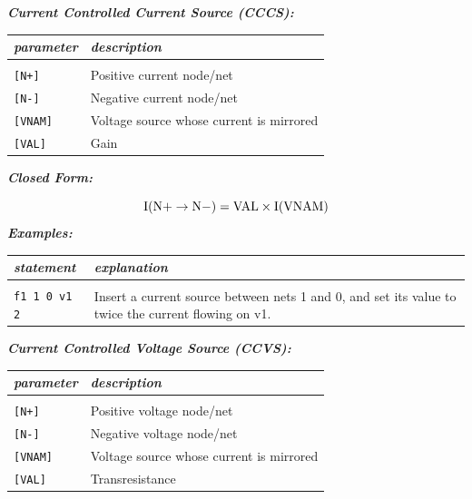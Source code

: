 \textbf{\textit{Current Controlled Current Source (CCCS):}}


\begin{longtable}{l l}
\textit{parameter} & \textit{description} \\ \hline \\ \vspace{-0.8\parskip}
\texttt{[N+]} & Positive current node/net \\
\texttt{[N-]} & Negative current node/net \\
\texttt{[VNAM]} & Voltage source  whose current is mirrored \\
\texttt{[VAL]} & Gain
\end{longtable}

\textbf{\textit{Closed Form:}}

  \[
    \rm{I}(\rm{N+}\to\rm{N-})= \rm{VAL}\times\rm{I}(\rm{VNAM})\nonumber
  \]
\textbf{\textit{Examples:}}

\begin{longtable}{l l}
\textit{statement} & \textit{explanation} \\ \hline \\ \vspace{-0.8\parskip} 
\begin{minipage}{15em}\texttt{f1 1 0 v1 2}\end{minipage}  
& 
\begin{minipage}{15em}{\small Insert a current source between nets 1 and 0, and set its value to twice the current flowing on v1.}\end{minipage}  
\end{longtable}

\textbf{\textit{Current Controlled Voltage Source (CCVS):}}


\begin{longtable}{l l}
\textit{parameter} & \textit{description} \\ \hline \\ \vspace{-0.8\parskip}
\texttt{[N+]} & Positive voltage node/net \\
\texttt{[N-]} & Negative voltage node/net \\
\texttt{[VNAM]} & Voltage source  whose current is mirrored \\
\texttt{[VAL]} & Transresistance
\end{longtable}

